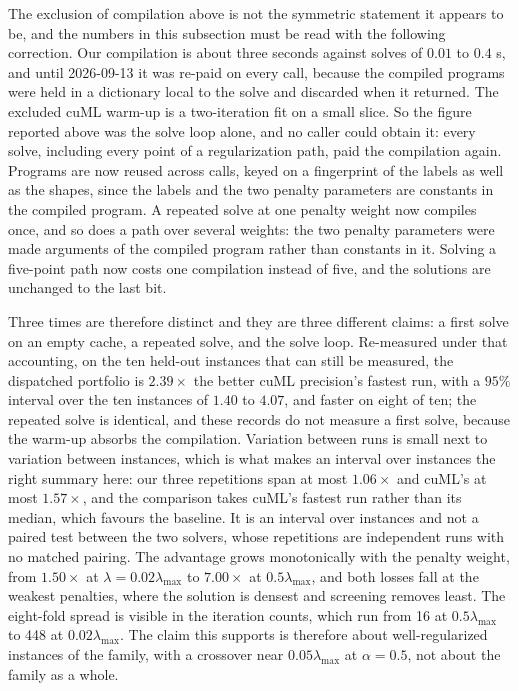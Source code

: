 The exclusion of compilation above is not the symmetric statement it appears to be,
and the numbers in this subsection must be read with the following correction. Our
compilation is about three seconds against solves of $0.01$ to $0.4$ s, and until
2026-09-13 it was re-paid on every call, because the compiled programs were held in a
dictionary local to the solve and discarded when it returned. The excluded cuML
warm-up is a two-iteration fit on a small slice. So the figure reported above was the
solve loop alone, and no caller could obtain it: every solve, including every point of
a regularization path, paid the compilation again. Programs are now reused across
calls, keyed on a fingerprint of the labels as well as the shapes, since the labels and
the two penalty parameters are constants in the compiled program. A repeated solve at
one penalty weight now compiles once, and so does a path over several weights: the two
penalty parameters were made arguments of the compiled program rather than constants
in it. Solving a five-point path now costs one compilation instead of five, and the
solutions are unchanged to the last bit.

Three times are therefore distinct and they are three different claims: a first solve
on an empty cache, a repeated solve, and the solve loop. Re-measured under that
accounting, on the ten held-out instances that can still be measured, the dispatched
portfolio is $2.39\times$ the better cuML precision's fastest run, with a $95\%$
interval over the ten instances of $1.40$ to $4.07$, and faster on eight of ten; the
repeated solve is identical, and these records do not measure a first solve, because
the warm-up absorbs the compilation. Variation between runs is small next to variation
between instances, which is what makes an interval over instances the right summary
here: our three repetitions span at most $1.06\times$ and cuML's at most $1.57\times$,
and the comparison takes cuML's fastest run rather than its median, which favours the
baseline. It is an interval over instances and not a paired test between the two
solvers, whose repetitions are independent runs with no matched pairing. The advantage grows monotonically with
the penalty weight, from $1.50\times$ at $\lambda = 0.02\lambda_{\max}$ to
$7.00\times$ at $0.5\lambda_{\max}$, and both losses fall at the weakest penalties,
where the solution is densest and screening removes least. The eight-fold spread is
visible in the iteration counts, which run from 16 at $0.5\lambda_{\max}$ to 448 at
$0.02\lambda_{\max}$. The claim this supports is therefore about well-regularized
instances of the family, with a crossover near $0.05\lambda_{\max}$ at $\alpha=0.5$,
not about the family as a whole.

